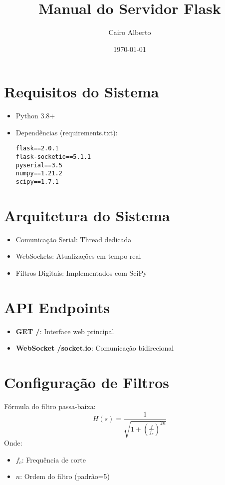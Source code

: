 \documentclass[12pt,a4paper]{article}
\title{Manual do Servidor Flask}
\author{Cairo Alberto}
\date{\today}
\begin{document}
\maketitle

\section{Requisitos do Sistema}
\begin{itemize}
\item Python 3.8+
\item Dependências (requirements.txt):
\begin{verbatim}
flask==2.0.1
flask-socketio==5.1.1
pyserial==3.5
numpy==1.21.2
scipy==1.7.1
\end{verbatim}
\end{itemize}

\section{Arquitetura do Sistema}
\begin{itemize}
\item Comunicação Serial: Thread dedicada
\item WebSockets: Atualizações em tempo real
\item Filtros Digitais: Implementados com SciPy
\end{itemize}

\section{API Endpoints}
\begin{itemize}
\item \textbf{GET /}: Interface web principal
\item \textbf{WebSocket /socket.io}: Comunicação bidirecional
\end{itemize}

\section{Configuração de Filtros}
Fórmula do filtro passa-baixa:
\[
H(s) = \frac{1}{\sqrt{1 + \left(\frac{f}{f_c}\right)^{2n}}}
\]
Onde:
\begin{itemize}
\item \(f_c\): Frequência de corte
\item \(n\): Ordem do filtro (padrão=5)
\end{itemize}
\end{document}
